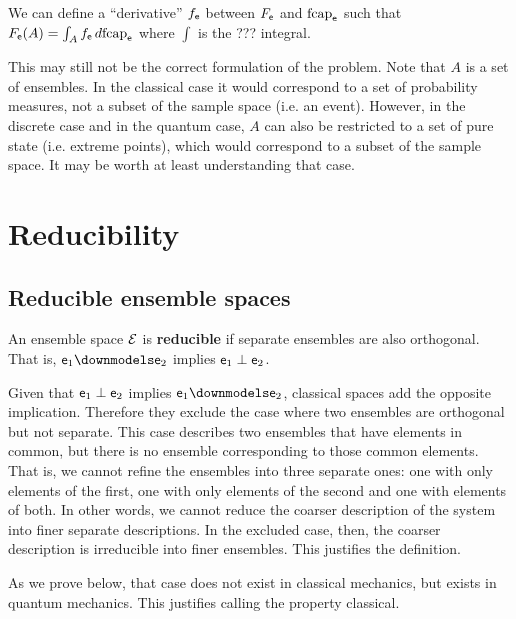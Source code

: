 \begin{conj}
	We can define a ``derivative'' $f_{\mathsf{e}}$ between $F_{\mathsf{e}}$ and $\mathrm{fcap}_{\mathsf{e}}$ such that $F_{\mathsf{e}}(A) = \int_A f_{\mathsf{e}} \, d \mathrm{fcap}_{\mathsf{e}}$ where $\int$ is the ??? integral.
\end{conj}

\begin{remark}
	This may still not be the correct formulation of the problem. Note that $A$ is a set of ensembles. In the classical case it would correspond to a set of probability measures, not a subset of the sample space (i.e. an event). However, in the discrete case and in the quantum case, $A$ can also be restricted to a set of pure state (i.e. extreme points), which would correspond to a subset of the sample space. It may be worth at least understanding that case.
\end{remark}


\section{Reducibility}

\subsection{Reducible ensemble spaces}

\begin{defn}
	An ensemble space $\mathcal{E}$ is \textbf{reducible} if separate ensembles are also orthogonal. That is, $\ens_1 \separate \ens_2$ implies $\mathsf{e}_1 \perp \mathsf{e}_2$.
\end{defn}

\begin{justification}
	Given that $\mathsf{e}_1 \perp \mathsf{e}_2$ implies $\ens_1 \separate \ens_2$, classical spaces add the opposite implication. Therefore they exclude the case where two ensembles are orthogonal but not separate. This case describes two ensembles that have elements in common, but there is no ensemble corresponding to those common elements. That is, we cannot refine the ensembles into three separate ones: one with only elements of the first, one with only elements of the second and one with elements of both. In other words, we cannot reduce the coarser description of the system into finer separate descriptions. In the excluded case, then, the coarser description is irreducible into finer ensembles. This justifies the definition.
	
	As we prove below, that case does not exist in classical mechanics, but exists in quantum mechanics. This justifies calling the property classical.
\end{justification}

